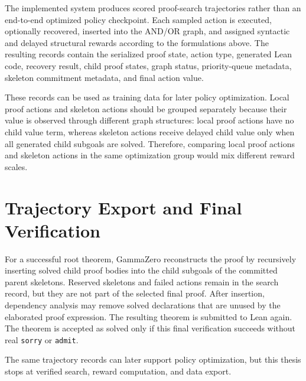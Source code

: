 The implemented system produces scored proof-search trajectories rather than an end-to-end optimized
policy checkpoint. Each sampled action is executed, optionally recovered, inserted into the AND/OR graph,
and assigned syntactic and delayed structural rewards according to the formulations above. The resulting records
contain the serialized proof state, action type, generated Lean code, recovery result, child proof states,
graph status, priority-queue metadata, skeleton commitment metadata, and final action value.

These records can be used as training data for later policy optimization. Local proof actions and
skeleton actions should be grouped separately because their value is observed through different graph
structures: local proof actions have no child value term, whereas skeleton actions receive delayed child
value only when all generated child subgoals are solved. Therefore, comparing local proof actions and
skeleton actions in the same optimization group would mix different reward scales.

\section{Trajectory Export and Final Verification}

For a successful root theorem, GammaZero reconstructs the proof by recursively inserting solved child
proof bodies into the child subgoals of the committed parent skeletons. Reserved skeletons and failed
actions remain in the search record, but they are not part of the selected final proof. After insertion,
dependency analysis may remove solved declarations that are unused by the elaborated proof expression.
The resulting theorem is submitted to Lean again. The theorem is accepted as solved only if this final
verification succeeds without real \texttt{sorry} or \texttt{admit}.

The same trajectory records can later support policy optimization, but this thesis stops at verified
search, reward computation, and data export.
